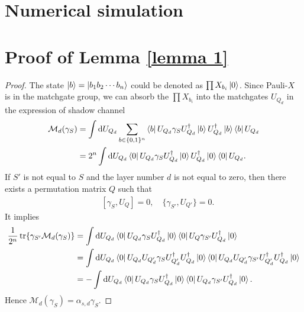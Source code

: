 \documentclass{article}
\begin{document}
\section{Numerical simulation}




\appendix

\section{Proof of Lemma \ref{lemma 1}}
\begin{proof}
The state $\ket{b}= \ket{b_1b_2\cdots b_n}$ could be denoted as $\prod X_{b_i} \ket{0}$. 
Since Pauli-$X$ is in the matchgate group, we can absorb the $\prod X_{b_i}$ into the matchgates $U_{Q_d}$ in the expression of shadow channel
\begin{align}
\mathcal{M}_d(\gamma_S) &= \int \dd U_{Q_d}\sum_{b\in\{0,1\}^n}\bra{b}U_{Q_d}\gamma_S U_{Q_d}^\dagger \ket{b} U_{Q_d}^\dagger \ket{b}\bra{b}U_{Q_d}\\
&= 2^n\int \dd U_{Q_d} \bra{0}U_{Q_d}\gamma_S U_{Q_d}^\dagger \ket{0} U_{Q_d}^\dagger \ket{0}\bra{0}U_{Q_d}.
\end{align}
If $S'$ is not equal to $ S$ and the layer number $d$ is not equal to zero, 
then there exists a permutation matrix $Q$ such that
\begin{align}
\quad [\gamma_{S}, U_{Q}] = 0, \quad \{\gamma_{S'}, U_{Q'}\} = 0. 
\end{align}
It implies
\begin{align}
\frac{1}{2^n}\tr{\gamma_{S'} \mathcal{M}_d(\gamma_S)} &= 
\int \dd U_{Q_d} \bra{0} U_{Q_d} \gamma_S U_{Q_d}^\dagger \ket{0}\bra{0}U_Q \gamma_{S'} U_{Q_d}^\dagger\ket{0}\\
&=\int \dd U_{Q_d} \bra{0}U_{Q_d} U_{Q'_d} \gamma_S U_{Q'_d}^\dagger U_{Q_d}^\dagger\ket{0}\bra{0}U_{Q_d} U_{Q'_d}\gamma_{S'} U_{Q'_d}^\dagger U_{Q_d}^\dagger\ket{0}\\
&= -\int \dd U_{Q_d} \bra{0}U_{Q_d} \gamma_S U_{Q_d}^\dagger\ket{0}\bra{0}U_{Q_d} \gamma_{S'} U_{Q_d}^\dagger\ket{0}.
\end{align}
Hence $\mathcal{M}_d (\gamma_S) = \alpha_{s,d} \gamma_S$.
\end{proof}
\end{document}
